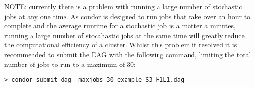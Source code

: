 NOTE: currently there is a problem with running a large number of
stochastic jobs at any one time. As condor is designed to run jobs that
take over an hour to complete and the average runtime for a stochastic
job is a matter a minutes, running a large number of stocahastic jobs at
the same time will greatly reduce the computational efficiency of a
cluster. Whilst this problem it resolved it is recommended to submit the
DAG with the following command, limiting the total number of jobs to run
to a maximum of 30:

\begin{verbatim}
> condor_submit_dag -maxjobs 30 example_S3_H1L1.dag
\end{verbatim}
